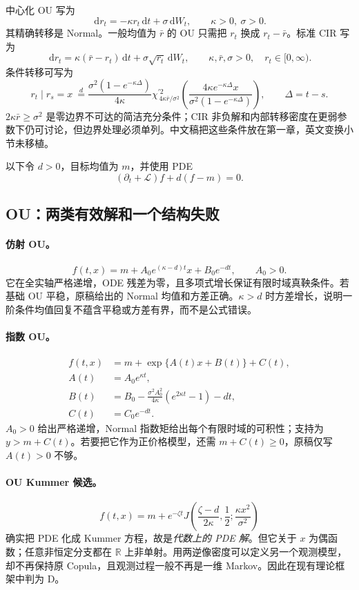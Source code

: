 \documentclass[UTF8,11pt]{ctexart}
\newcommand{\R}{\mathbb R}
\newcommand{\dd}{\,\mathrm d}
\begin{document}
中心化 OU 写为
\[
\dd r_t=-\kappa r_t\dd t+\sigma\dd W_t,\qquad \kappa>0,\ \sigma>0.
\]
其精确转移是 Normal。一般均值为 $\bar r$ 的 OU 只需把 $r_t$ 换成 $r_t-\bar r$。标准 CIR 写为
\begin{equation}
\dd r_t=\kappa(\bar r-r_t)\dd t+\sigma\sqrt{r_t}\dd W_t,
\qquad \kappa,\bar r,\sigma>0,\quad r_t\in[0,\infty).
\label{cmp:cir-sde}
\end{equation}
条件转移可写为
\[
r_t\mid r_s=x\ \overset d=
\frac{\sigma^2(1-e^{-\kappa\Delta})}{4\kappa}
\chi^{\prime 2}_{\,4\kappa\bar r/\sigma^2}
\!\left(\frac{4\kappa e^{-\kappa\Delta}x}
{\sigma^2(1-e^{-\kappa\Delta})}\right),\qquad \Delta=t-s.
\]
$2\kappa\bar r\ge\sigma^2$ 是零边界不可达的简洁充分条件；CIR 非负解和内部转移密度在更弱参数下仍可讨论，但边界处理必须单列。中文稿把这些条件放在第一章，英文变换小节未移植。

以下令 $d>0$，目标均值为 $m$，并使用 PDE
\[
(\partial_t+\mathcal L)f+d(f-m)=0.
\]

\subsection{OU：两类有效解和一个结构失败}

\paragraph{仿射 OU。}
\[
f(t,x)=m+A_0e^{(\kappa-d)t}x+B_0e^{-dt},\qquad A_0>0.
\]
它在全实轴严格递增，ODE 残差为零，且多项式增长保证有限时域真鞅条件。若基础 OU 平稳，原稿给出的 Normal 均值和方差正确。$\kappa>d$ 时方差增长，说明一阶条件均值回复不蕴含平稳或方差有界，而不是公式错误。

\paragraph{指数 OU。}
\begin{align*}
f(t,x)&=m+\exp\{A(t)x+B(t)\}+C(t),\\
A(t)&=A_0e^{\kappa t},\\
B(t)&=B_0-\frac{\sigma^2A_0^2}{4\kappa}(e^{2\kappa t}-1)-dt,\\
C(t)&=C_0e^{-dt}.
\end{align*}
$A_0>0$ 给出严格递增，Normal 指数矩给出每个有限时域的可积性；支持为
$y>m+C(t)$。若要把它作为正价格模型，还需 $m+C(t)\ge0$，原稿仅写 $A(t)>0$ 不够。

\paragraph{OU Kummer 候选。}
\[
f(t,x)=m+e^{-\zeta t}
J\!\left(\frac{\zeta-d}{2\kappa},\frac12;
\frac{\kappa x^2}{\sigma^2}\right)
\]
确实把 PDE 化成 Kummer 方程，故是\emph{代数上的 PDE 解}。但它关于 $x$ 为偶函数；任意非恒定分支都在 $\R$ 上非单射。用两逆像密度可以定义另一个观测模型，却不再保持原 Copula，且观测过程一般不再是一维 Markov。因此在现有理论框架中判为 D。
\end{document}

